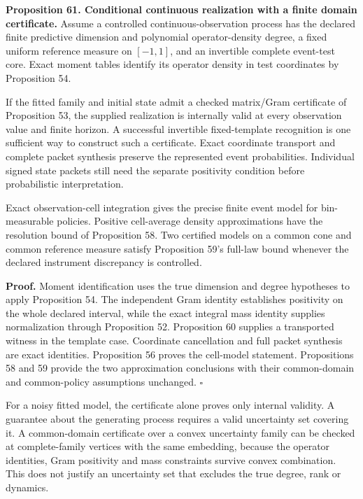 \textbf{Proposition 61. Conditional continuous realization with a finite
domain certificate.} Assume a controlled continuous-observation process
has the declared finite predictive dimension and polynomial
operator-density degree, a fixed uniform reference measure on
\([-1,1]\), and an invertible complete event-test core. Exact moment
tables identify its operator density in test coordinates by Proposition
54.

If the fitted family and initial state admit a checked matrix/Gram
certificate of Proposition 53, the supplied realization is internally
valid at every observation value and finite horizon. A successful
invertible fixed-template recognition is one sufficient way to construct
such a certificate. Exact coordinate transport and complete packet
synthesis preserve the represented event probabilities. Individual
signed state packets still need the separate positivity condition before
probabilistic interpretation.

Exact observation-cell integration gives the precise finite event model
for bin-measurable policies. Positive cell-average density
approximations have the resolution bound of Proposition 58. Two
certified models on a common cone and common reference measure satisfy
Proposition 59's full-law bound whenever the declared instrument
discrepancy is controlled.

\textbf{Proof.} Moment identification uses the true dimension and degree
hypotheses to apply Proposition 54. The independent Gram identity
establishes positivity on the whole declared interval, while the exact
integral mass identity supplies normalization through Proposition 52.
Proposition 60 supplies a transported witness in the template case.
Coordinate cancellation and full packet synthesis are exact identities.
Proposition 56 proves the cell-model statement. Propositions 58 and 59
provide the two approximation conclusions with their common-domain and
common-policy assumptions unchanged. \(\square\)

For a noisy fitted model, the certificate alone proves only internal
validity. A guarantee about the generating process requires a valid
uncertainty set covering it. A common-domain certificate over a convex
uncertainty family can be checked at complete-family vertices with the
same embedding, because the operator identities, Gram positivity and
mass constraints survive convex combination. This does not justify an
uncertainty set that excludes the true degree, rank or dynamics.


